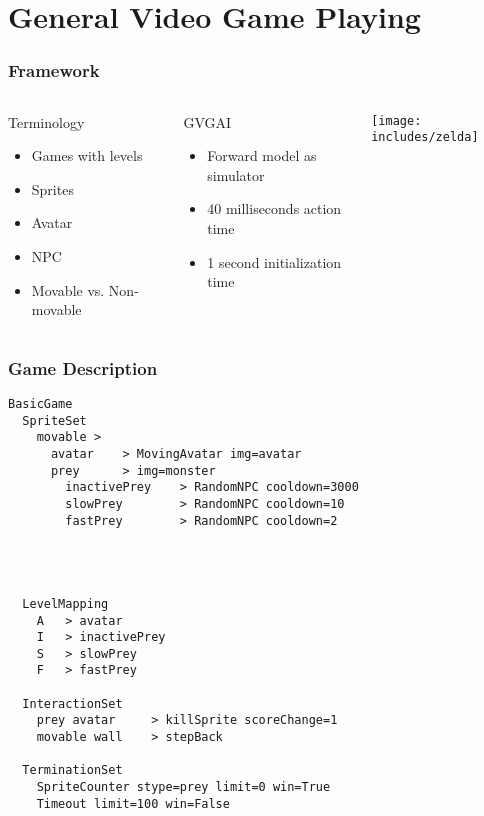 \documentclass[aspectratio=169]{beamer}
\begin{document}
\section{General Video Game Playing}
\begin{frame}
	\frametitle{Framework}
	\begin{columns}
		\begin{block}{Terminology}
			\begin{itemize}
				\item Games with levels
				\item Sprites
				\item Avatar
				\item NPC
				\item Movable vs. Non-movable
			\end{itemize}
		\end{block}
		\begin{block}{GVGAI}
			\begin{itemize}
				\item Forward model as simulator
				\item 40 milliseconds action time
				\item 1 second initialization time
			\end{itemize}
		\end{block}
			\texttt{[image: includes/zelda]}
	\end{columns}

\end{frame}
\begin{frame}
	\frametitle{Game Description}
	\begin{lstlisting}[caption=Game Description, frame=tb]
BasicGame
  SpriteSet
    movable >
      avatar    > MovingAvatar img=avatar
      prey      > img=monster
        inactivePrey    > RandomNPC cooldown=3000
        slowPrey        > RandomNPC cooldown=10
        fastPrey        > RandomNPC cooldown=2




  LevelMapping
    A   > avatar
    I   > inactivePrey
    S   > slowPrey
    F   > fastPrey

  InteractionSet
    prey avatar     > killSprite scoreChange=1
    movable wall    > stepBack

  TerminationSet
    SpriteCounter stype=prey limit=0 win=True
    Timeout limit=100 win=False
	\end{lstlisting}
\end{frame}
\end{document}
